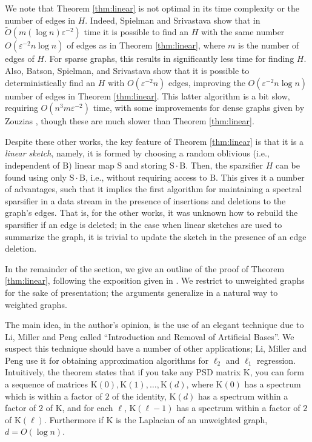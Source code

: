 \documentclass[11pt]{article}
\newcommand{\mat}[1]{{\ensuremath{\bm{\mathrm{#1}}}}}
\def\matB{\mat{B}}
\def\matK{\mat{K}}
\def\matS{\mat{S}}
\newcommand{\eps}{\varepsilon}
\begin{document}
We note that Theorem \ref{thm:linear} is not optimal in its time complexity or the number of edges
in $H$. Indeed, Spielman and Srivastava \cite{SS08} show that in $\tilde{O}(m (\log n) \eps^{-2})$ time
it is possible to find an $H$ with the same number $O(\eps^{-2} n \log n)$ of edges as in Theorem \ref{thm:linear},
where $m$ is the number of edges of $H$. For sparse graphs, this results in significantly less time for finding
$H$. Also, Batson, Spielman, and Srivastava \cite{BSS09} show that it is possible to deterministically find
an $H$ with $O(\eps^{-2} n)$ edges, improving the $O(\eps^{-2} n \log n)$ number of edges in Theorem \ref{thm:linear}. This
latter algorithm is a bit slow, requiring $O(n^3 m \eps^{-2})$ time, with some improvements for dense graphs 
given by Zouzias \cite{z12}, though these are much slower than Theorem \ref{thm:linear}. 

Despite these other works, the key feature of Theorem \ref{thm:linear} is that it is a {\it linear sketch}, namely, it is formed by choosing a random oblivious (i.e., independent of $\matB$) linear map $\matS$ and storing $\matS \cdot \matB$. Then, the sparsifier
$H$ can be found using only $\matS \cdot \matB$, i.e., without requiring
access to $\matB$. This gives
it a number of advantages, such that it implies the first algorithm for maintaining a spectral sparsifier in a
data stream in the presence of insertions and deletions to the graph's edges. That is, for the other works, it was
unknown how to rebuild the sparsifier if an edge is deleted; in the case when linear sketches are used to summarize
the graph, it is trivial to update the sketch in the presence of an edge deletion. 

In the remainder of the section, we give an outline of the proof of Theorem \ref{thm:linear}, following the exposition given
in \cite{KLMMS14}. We restrict to unweighted graphs for the sake of presentation; the arguments generalize in a natural
way to weighted graphs. 

The main idea, in the author's opinion, is the 
use of an elegant technique due to Li, Miller and Peng \cite{lmp13} called ``Introduction and Removal of Artificial Bases''. 
We suspect this technique should have a number of other applications; Li, Miller and Peng use it for
obtaining approximation algorithms for $\ell_2$ and $\ell_1$ regression. 
Intuitively, the theorem states that if you take any PSD matrix $\matK$, you can form a sequence
of matrices $\matK(0), \matK(1), \ldots, \matK(d)$, where $\matK(0)$ has a spectrum which is
within a factor of $2$ of the identity, $\matK(d)$ has a spectrum within a factor of 
$2$ of $\matK$, and for
each $\ell$, $\matK(\ell-1)$ has a spectrum within a factor of $2$ of $\matK(\ell)$. Furthermore
if $\matK$ is the Laplacian of an unweighted graph, $d = O(\log n)$. 
\end{document}
